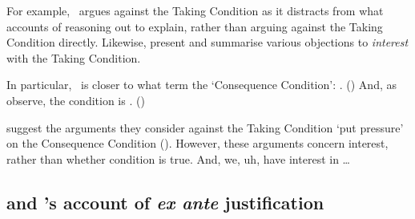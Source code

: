 \begin{note}
{    For example,~\citeauthor{Hlobil:2014tq} argues against the Taking Condition as it distracts from what accounts of reasoning out to explain, rather than arguing against the Taking Condition directly.
    Likewise, \citeauthor{McHugh:2016vp} present and summarise various objections to \emph{interest} with the Taking Condition.

    In particular,~\supportI{} is closer to what \citeauthor{McHugh:2016vp} term the `Consequence Condition': .
    (\citeyear[316]{McHugh:2016vp})
    And, as \citeauthor{McHugh:2016vp} observe, the condition is .
    (\citeyear[316]{McHugh:2016vp})

    \citeauthor{McHugh:2016vp} suggest the arguments they consider against the Taking Condition `put pressure' on the Consequence Condition (\citeyear[327]{McHugh:2016vp}).
    However, these arguments concern interest, rather than whether condition is true.
    And, we, uh, have interest in \dots
  }
\end{note}



\subsection*{\supportII{} and \citeauthor{Goldman:1979ui}'s account of \emph{ex ante} justification}


